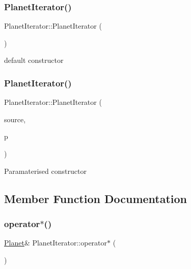 \subsubsection{\texorpdfstring{Planet\+Iterator()}{PlanetIterator()}\hspace{0.1cm}{\footnotesize\ttfamily [1/2]}}
{\footnotesize\ttfamily Planet\+Iterator\+::\+Planet\+Iterator (\begin{DoxyParamCaption}{ }\end{DoxyParamCaption})}

default constructor \mbox{\label{classPlanetIterator_ab5c84527dd5b82051e9f59c650dbd5bc}} 
\subsubsection{\texorpdfstring{Planet\+Iterator()}{PlanetIterator()}\hspace{0.1cm}{\footnotesize\ttfamily [2/2]}}
{\footnotesize\ttfamily Planet\+Iterator\+::\+Planet\+Iterator (\begin{DoxyParamCaption}\item[{const \hyperlink{classPlanetQueue}{Planet\+Queue} \&}]{source,  }\item[{\hyperlink{classNode}{Node} $\ast$}]{p }\end{DoxyParamCaption})\hspace{0.3cm}{\ttfamily [protected]}}

Paramaterised constructor 

\subsection{Member Function Documentation}
\mbox{\label{classPlanetIterator_a71bfc8a3a3eec78ab1a1f6cc2a7a1cf8}} 
\subsubsection{\texorpdfstring{operator$\ast$()}{operator*()}}
{\footnotesize\ttfamily \hyperlink{classPlanet}{Planet}\& Planet\+Iterator\+::operator$\ast$ (\begin{DoxyParamCaption}{ }\end{DoxyParamCaption})}

